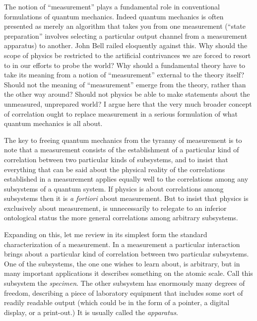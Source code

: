 \bigskip {}\nobreak\medskip\nobreak The notion of ``measurement''
plays a fundamental role in conventional formulations of quantum
mechanics.  Indeed quantum mechanics is often presented as merely an
algorithm that takes you from one measurement (``state preparation''
involves selecting a particular output channel from a measurement
apparatus) to another.  John Bell railed eloquently against this.\fn
Why should the scope of physics be restricted to the artificial
contrivances we are forced to resort to in our efforts to probe the
world?  Why should a fundamental theory have to take its meaning from
a notion of ``measurement'' external to the theory itself?  Should not
the meaning of ``measurement'' emerge from the theory, rather than the
other way around?  Should not physics be able to make statements about
the unmeasured, unprepared world?    \ni I argue here that the
very much broader concept of correlation ought to replace measurement
in a serious formulation of what quantum mechanics is all about.\fn

The key to freeing quantum mechanics from the tyranny of measurement
is to note that a measurement consists of the
establishment of a particular kind of correlation between two
particular kinds of subsystems, and to insist that everything
that can be said about the physical reality of the correlations
established in a measurement applies equally well to the correlations
among any subsystems of a quantum system.  If physics is about
correlations among subsystems then it is {\it a fortiori\/} about
measurement.  But to insist that physics is exclusively about
measurement, is unnecessarily to relegate to an inferior ontological
status the more general correlations among arbitrary subsystems.

Expanding on this, let me review in its simplest form the standard
characterization of a measurement.  In a measurement a particular
interaction brings about a particular kind of correlation between two
particular subsystems.  One of the subsystems, the one one wishes to
learn about, is arbitrary, but in many important applications it
describes something on the atomic scale.  Call this subsystem
the {\it specimen\/}.  The other subsystem has enormously many degrees
of freedom, describing a piece of laboratory equipment that includes
some sort of readily readable output (which could be in the
form of a pointer, a digital display, or a print-out.)  It is usually
called the {\it apparatus\/}.  

